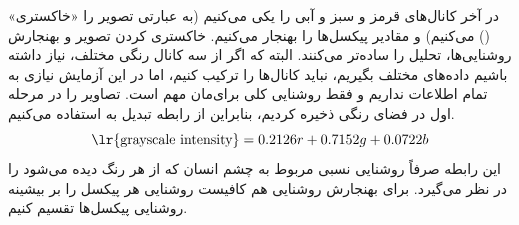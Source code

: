 \documentclass[12pt,a4paper]{article}
\begin{document}
	در آخر کانال‌های قرمز و سبز و آبی را یکی می‌کنیم (به عبارتی تصویر را «خاکستری» () می‌کنیم) و مقادیر
	پیکسل‌ها را بهنجار می‌کنیم. خاکستری کردن تصویر و بهنجارش روشنایی‌ها، تحلیل را ساده‌تر می‌کنند. البته که اگر از سه
	کانال رنگی مختلف، نیاز داشته باشیم داده‌های مختلف بگیریم، نباید کانال‌ها را ترکیب کنیم، اما در این آزمایش نیازی
	به تمام اطلاعات نداریم و فقط روشنایی کلی برای‌مان مهم است. تصاویر را در مرحله اول در فضای رنگی  ذخیره
	کردیم، بنابراین از رابطه تبدیل  به  استفاده می‌کنیم.
	\begin{equation}
		\text{\lr{grayscale intensity}} = 0.2126r + 0.7152g + 0.0722b
	\end{equation}
	این رابطه صرفاً روشنایی نسبی مربوط به چشم انسان که از هر رنگ دیده می‌شود را در نظر می‌گیرد. برای بهنجارش روشنایی
	هم کافیست روشنایی هر پیکسل را بر بیشینه روشنایی پیکسل‌ها تقسیم کنیم.
\end{document}
